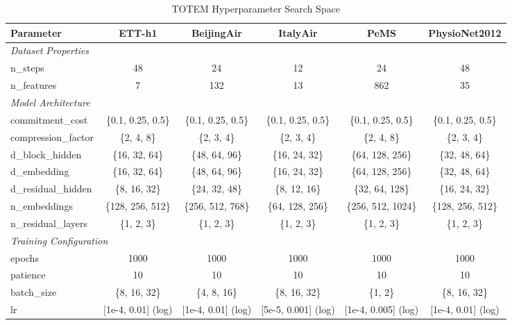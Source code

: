 \begin{table}[H]
\centering
\caption{TOTEM Hyperparameter Search Space}
\label{tab:hyperparam_totem}
\begin{adjustbox}{max width=\textwidth}
\begin{small}
\begin{tabular}{l|ccccc}
\toprule
\textbf{Parameter} & \textbf{ETT-h1} & \textbf{BeijingAir} & \textbf{ItalyAir} & \textbf{PeMS} & \textbf{PhysioNet2012} \\
\midrule
\multicolumn{6}{l}{\textit{Dataset Properties}} \\
n\_steps & 48 & 24 & 12 & 24 & 48 \\
n\_features & 7 & 132 & 13 & 862 & 35 \\
\midrule
\multicolumn{6}{l}{\textit{Model Architecture}} \\
commitment\_cost & \{0.1, 0.25, 0.5\} & \{0.1, 0.25, 0.5\} & \{0.1, 0.25, 0.5\} & \{0.1, 0.25, 0.5\} & \{0.1, 0.25, 0.5\} \\
compression\_factor & \{2, 4, 8\} & \{2, 3, 4\} & \{2, 3, 4\} & \{2, 4, 8\} & \{2, 3, 4\} \\
d\_block\_hidden & \{16, 32, 64\} & \{48, 64, 96\} & \{16, 24, 32\} & \{64, 128, 256\} & \{32, 48, 64\} \\
d\_embedding & \{16, 32, 64\} & \{48, 64, 96\} & \{16, 24, 32\} & \{64, 128, 256\} & \{32, 48, 64\} \\
d\_residual\_hidden & \{8, 16, 32\} & \{24, 32, 48\} & \{8, 12, 16\} & \{32, 64, 128\} & \{16, 24, 32\} \\
n\_embeddings & \{128, 256, 512\} & \{256, 512, 768\} & \{64, 128, 256\} & \{256, 512, 1024\} & \{128, 256, 512\} \\
n\_residual\_layers & \{1, 2, 3\} & \{1, 2, 3\} & \{1, 2, 3\} & \{1, 2, 3\} & \{1, 2, 3\} \\
\midrule
\multicolumn{6}{l}{\textit{Training Configuration}} \\
epochs & 1000 & 1000 & 1000 & 1000 & 1000 \\
patience & 10 & 10 & 10 & 10 & 10 \\
batch\_size & \{8, 16, 32\} & \{4, 8, 16\} & \{8, 16, 32\} & \{1, 2\} & \{8, 16, 32\} \\
lr & [1e-4, 0.01] (log) & [1e-4, 0.01] (log) & [5e-5, 0.001] (log) & [1e-4, 0.005] (log) & [1e-4, 0.01] (log) \\
\bottomrule
\end{tabular}
\end{small}
\end{adjustbox}
\end{table}